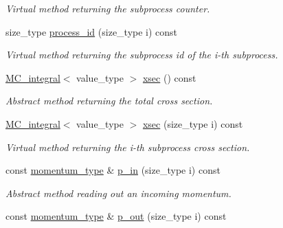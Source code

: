 \begin{DoxyCompactItemize}
\begin{DoxyCompactList}\small\item\em Virtual method returning the subprocess counter. \end{DoxyCompactList}\item 
\hypertarget{a00454_aadc193b8c69d1915c55efa2e7dca0470}{}size\+\_\+type \hyperlink{a00454_aadc193b8c69d1915c55efa2e7dca0470}{process\+\_\+id} (size\+\_\+type i) const \label{a00454_aadc193b8c69d1915c55efa2e7dca0470}

\begin{DoxyCompactList}\small\item\em Virtual method returning the subprocess id of the i-\/th subprocess. \end{DoxyCompactList}\item 
\hypertarget{a00454_a185cb10de7f8354a746fd757829942f3}{}\hyperlink{a00368}{M\+C\+\_\+integral}$<$ value\+\_\+type $>$ \hyperlink{a00454_a185cb10de7f8354a746fd757829942f3}{xsec} () const \label{a00454_a185cb10de7f8354a746fd757829942f3}

\begin{DoxyCompactList}\small\item\em Abstract method returning the total cross section. \end{DoxyCompactList}\item 
\hypertarget{a00454_a8738056910322dc6906fa894b2fd07ae}{}\hyperlink{a00368}{M\+C\+\_\+integral}$<$ value\+\_\+type $>$ \hyperlink{a00454_a8738056910322dc6906fa894b2fd07ae}{xsec} (size\+\_\+type i) const \label{a00454_a8738056910322dc6906fa894b2fd07ae}

\begin{DoxyCompactList}\small\item\em Virtual method returning the i-\/th subprocess cross section. \end{DoxyCompactList}\item 
\hypertarget{a00454_a4b4e56fdc8c0ba5a64683f8290bc3349}{}const \hyperlink{a00579}{momentum\+\_\+type} \& \hyperlink{a00454_a4b4e56fdc8c0ba5a64683f8290bc3349}{p\+\_\+in} (size\+\_\+type i) const \label{a00454_a4b4e56fdc8c0ba5a64683f8290bc3349}

\begin{DoxyCompactList}\small\item\em Abstract method reading out an incoming momentum. \end{DoxyCompactList}\item 
\hypertarget{a00454_a1b7b4bf5833b12556d5dc059c0489773}{}const \hyperlink{a00579}{momentum\+\_\+type} \& \hyperlink{a00454_a1b7b4bf5833b12556d5dc059c0489773}{p\+\_\+out} (size\+\_\+type i) const \label{a00454_a1b7b4bf5833b12556d5dc059c0489773}


\end{DoxyCompactItemize}
